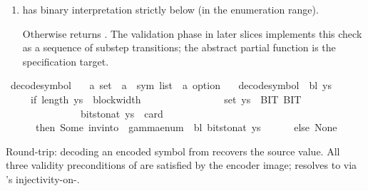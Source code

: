 \begin{isabellebody}
\begin{isamarkuptext}
\begin{enumerate}
\item has binary interpretation strictly below
 (in the enumeration range).

Otherwise returns .  The validation phase in
later slices implements this check as a sequence of substep
transitions; the abstract  partial
function is the specification target.%
\end{enumerate}%
\end{isamarkuptext}\isamarkuptrue%
\isamarkupfalse%
\ decode{\isacharunderscore}{\kern0pt}symbol\ {\isacharcolon}{\kern0pt}{\isacharcolon}{\kern0pt}\isanewline
\ \ {\isachardoublequoteopen}{\isacharprime}{\kern0pt}a\ set\ {\isasymRightarrow}\ {\isacharprime}{\kern0pt}a\ {\isasymRightarrow}\ sym{}\ list\ {\isasymRightarrow}\ {\isacharprime}{\kern0pt}a\ option{\isachardoublequoteclose}\ \isanewline
\ \ {\isachardoublequoteopen}decode{\isacharunderscore}{\kern0pt}symbol\ {\isasymGamma}\ bl\ ys\ {\isacharequal}{\kern0pt}\isanewline
\ \ \ \ \ {\isacharparenleft}{\kern0pt}if\ length\ ys\ {\isacharequal}{\kern0pt}\ block{\isacharunderscore}{\kern0pt}width\ {\isasymGamma}\isanewline
\ \ \ \ \ \ \ \ \ \ \ \ \ \ {\isasymand}\ set\ ys\ {\isasymsubseteq}\ {\isacharbraceleft}{\kern0pt}BIT{}{\isacharcomma}{\kern0pt}\ BIT{}{\isacharbraceright}{\kern0pt}\isanewline
\ \ \ \ \ \ \ \ \ \ \ \ \ \ {\isasymand}\ bits{\isacharunderscore}{\kern0pt}to{\isacharunderscore}{\kern0pt}nat\ ys\ {\isacharless}{\kern0pt}\ card\ {\isasymGamma}\isanewline
\ \ \ \ \ \ then\ Some\ {\isacharparenleft}{\kern0pt}inv{\isacharunderscore}{\kern0pt}into\ {\isasymGamma}\ {\isacharparenleft}{\kern0pt}gamma{\isacharunderscore}{\kern0pt}enum\ {\isasymGamma}\ bl{\isacharparenright}{\kern0pt}\ {\isacharparenleft}{\kern0pt}bits{\isacharunderscore}{\kern0pt}to{\isacharunderscore}{\kern0pt}nat\ ys{\isacharparenright}{\kern0pt}{\isacharparenright}{\kern0pt}\isanewline
\ \ \ \ \ \ else\ None{\isacharparenright}{\kern0pt}{\isachardoublequoteclose}%
\begin{isamarkuptext}%
Round-trip: decoding an encoded symbol from
  \isa{{\isasymGamma}} recovers the source value.  All three validity
  preconditions of  are satisfied by the
  encoder image;  resolves to  via
  's injectivity-on-\isa{{\isasymGamma}}.%
\end{isamarkuptext}\isamarkuptrue%

\end{isabellebody}
